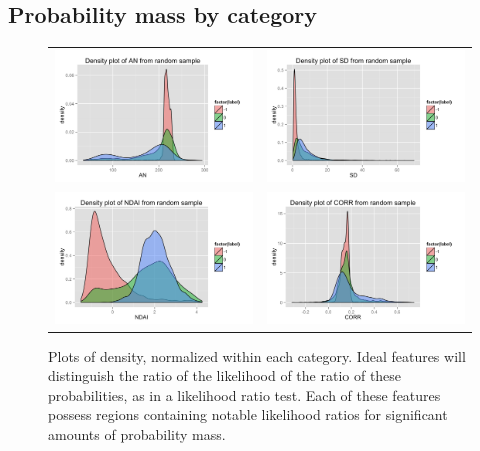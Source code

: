 \documentclass[english]{article}\usepackage{graphicx, color}
\numberwithin{equation}{section}
\numberwithin{figure}{section}
\begin{document}
\subsection{Probability mass by category}
\begin{figure}[!h]
\begin{tabular}{cc}
  \includegraphics[width=80mm]{../figures/density-AN.png} &
  \includegraphics[width=80mm]{../figures/density-SD.png}  \\
  \includegraphics[width=80mm]{../figures/density-NDAI.png} &
  \includegraphics[width=80mm]{../figures/density-CORR.png}  \\
\end{tabular}
\caption{Plots of density, normalized within each category. Ideal features will 
	distinguish the ratio of the likelihood of the ratio of these probabilities, as in 
	a likelihood ratio test. Each of these features possess regions containing 
	notable likelihood ratios for significant amounts of probability mass.}
\label{fig:EDAdensity}
\end{figure}
\end{document}
